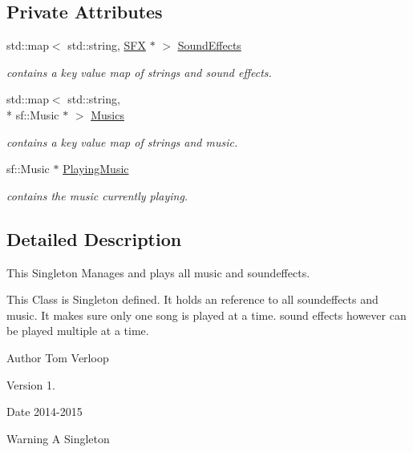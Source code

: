 \subsection*{Private Attributes}
\begin{DoxyCompactItemize}
\item 
std\-::map$<$ std\-::string, \hyperlink{class_s_f_x}{S\-F\-X} $\ast$ $>$ \hyperlink{class_audio_manager_a3dcd808b32f86411be40485188f6a917}{Sound\-Effects}
\begin{DoxyCompactList}\small\item\em contains a key value map of strings and sound effects. \end{DoxyCompactList}\item 
std\-::map$<$ std\-::string, \\*
sf\-::\-Music $\ast$ $>$ \hyperlink{class_audio_manager_af4fd3dd64a38f93f808955a626982cc2}{Musics}
\begin{DoxyCompactList}\small\item\em contains a key value map of strings and music. \end{DoxyCompactList}\item 
sf\-::\-Music $\ast$ \hyperlink{class_audio_manager_a8309e75d7e8ac5ecf53d5d8e787d8dc8}{Playing\-Music}
\begin{DoxyCompactList}\small\item\em contains the music currently playing. \end{DoxyCompactList}\end{DoxyCompactItemize}


\subsection{Detailed Description}
This Singleton Manages and plays all music and soundeffects. 

This Class is Singleton defined. It holds an reference to all soundeffects and music. It makes sure only one song is played at a time. sound effects however can be played multiple at a time. \begin{DoxyAuthor}{Author}
Tom Verloop 
\end{DoxyAuthor}
\begin{DoxyVersion}{Version}
1. 
\end{DoxyVersion}
\begin{DoxyDate}{Date}
2014-\/2015 
\end{DoxyDate}
\begin{DoxyWarning}{Warning}
A Singleton 
\end{DoxyWarning}



